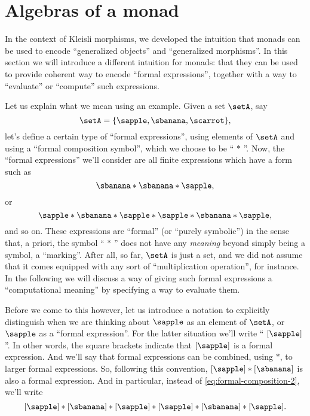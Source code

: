 

\section{Algebras of a monad}
\label{sec:Eilenberg-Moore}




In the context of Kleisli morphisms, we developed the intuition that monads can be used to encode ``generalized objects'' and ``generalized morphisms''. In this section we will introduce a different intuition for monads: that they can be used to provide coherent way to encode ``formal expressions'', together with a way to ``evaluate'' or ``compute'' such expressions.

Let us explain what we mean using an example. Given a set $\setA$, say
\begin{equation}
\setA = \{ \sapple, \sbanana, \scarrot \},
\end{equation}
let's define a certain type of ``formal expressions'', using elements of $\setA$ and using a ``formal composition symbol'', which we choose to be `` $*$ ''. Now, the ``formal expressions'' we'll consider are all finite expressions which have a form such as
\begin{equation}\label{eq:formal-composition-1}
 \sbanana * \sbanana * \sapple,
\end{equation}
or
\begin{equation}\label{eq:formal-composition-2}
\sapple * \sbanana * \sapple * \sapple * \sbanana * \sapple,
\end{equation}
and so on.
These expressions are ``formal'' (or ``purely symbolic'') in the sense that, a priori, the symbol `` $*$ '' does not have any \emph{meaning} beyond simply being a symbol, a ``marking''. After all, so far, $\setA$ is just a set, and we did not assume that it comes equipped with any sort of ``multiplication operation'', for instance. In the following we will discuss a way of giving such formal expressions a ``computational meaning'' by specifying a way to evaluate them.


Before we come to this however, let us introduce a notation to explicitly distinguish when we are thinking about $\sapple$ as an element of $\setA$, or $\sapple$ as a ``formal expression''. For the latter situation we'll write `` $[\sapple]$ ''.
In other words, the square brackets indicate that $[\sapple]$ is a formal expression. And we'll say that formal expressions can be combined, using $*$, to larger formal expressions. So, following this convention, $[\sapple] * [\sbanana]$ is also a formal expression. And in particular, instead of \cref{eq:formal-composition-2}, we'll write
\begin{equation}\label{eq:formal-composition-bracketed}
[\sapple] * [\sbanana] * [\sapple] * [\sapple] * [\sbanana] * [\sapple].
\end{equation}

